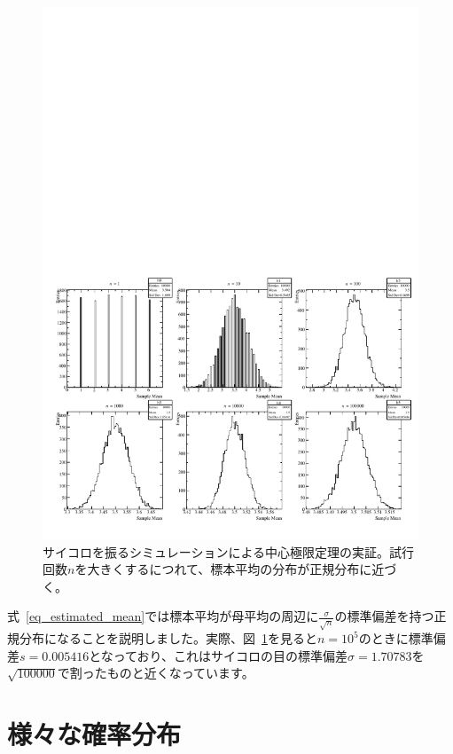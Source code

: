 \begin{figure}
  \centering
  \includegraphics[width=15cm]{fig/dice_central_limit_theorem.pdf}
  \caption{サイコロを振るシミュレーションによる中心極限定理の実証。試行回数$n$を大きくするにつれて、標本平均の分布が正規分布に近づく。}
  \label{fig_central_limit_theorem}
\end{figure}

式~\ref{eq_estimated_mean}では標本平均が母平均の周辺に$\frac{\sigma}{\sqrt{n}}$の標準偏差を持つ正規分布になることを説明しました。実際、図~\ref{fig_central_limit_theorem}を見ると$n=10^5$のときに標準偏差$s=0.005416$となっており、これはサイコロの目の標準偏差$\sigma=1.70783$を$\sqrt{100000}$で割ったものと近くなっています。

\section{様々な確率分布}


